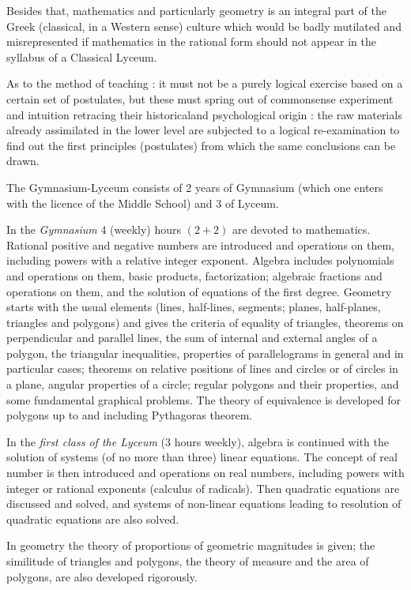 Besides that, mathematics and particularly geometry is an integral part of the Greek (classical, in a Western sense) culture which would be badly mutilated and misrepresented if mathematics in the rational form should not appear in the syllabus of a Classical Lyceum.

As to the method of teaching : it must not be a purely logical exercise based on a certain set of postulates, but these must spring out of commonsense experiment and intuition retracing their historical\pageoriginale and psychological origin : the raw materials already assimilated in the lower level are subjected to a logical re-examination to find out the first principles (postulates) from which the same conclusions can be drawn.

The Gymnasium-Lyceum consists of 2 years of Gymnasium (which one enters with the licence of the Middle School) and 3 of Lyceum.

In the {\em Gymnasium} 4 (weekly) hours $(2+2)$ are devoted to mathematics. Rational positive and negative numbers are introduced and operations on them, including powers with a relative integer exponent. Algebra includes polynomials and operations on them, basic products, factorization; algebraic fractions and operations on them, and the solution of equations of the first degree. Geometry starts with the usual elements (lines, half-lines, segments; planes, half-planes, triangles and polygons) and gives the criteria of equality of triangles, theorems on perpendicular and parallel lines, the sum of internal and external angles of a polygon, the triangular inequalities, properties of parallelograms in general and in particular cases; theorems on relative positions of lines and circles or of circles in a plane, angular properties of a circle; regular polygons and their properties, and some fundamental graphical problems. The theory of equivalence is developed for polygons up to and including Pythagoras theorem.

In the {\em first class of the Lyceum} (3 hours weekly), algebra is continued with the solution of systems (of no more than three) linear equations. The concept of real number is then introduced and operations on real numbers, including powers with integer or rational exponents (calculus of radicals). Then quadratic equations are discussed and solved, and systems of non-linear equations leading to resolution of quadratic equations are also solved.

In geometry the theory of proportions of geometric magnitudes is given; the similitude of triangles and polygons, the theory of measure and the area of polygons, are also developed rigorously.

